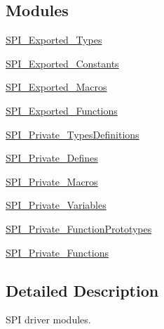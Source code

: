 \subsection*{Modules}
\begin{DoxyCompactItemize}
\item 
\hyperlink{group___s_p_i___exported___types}{S\+P\+I\+\_\+\+Exported\+\_\+\+Types}
\item 
\hyperlink{group___s_p_i___exported___constants}{S\+P\+I\+\_\+\+Exported\+\_\+\+Constants}
\item 
\hyperlink{group___s_p_i___exported___macros}{S\+P\+I\+\_\+\+Exported\+\_\+\+Macros}
\item 
\hyperlink{group___s_p_i___exported___functions}{S\+P\+I\+\_\+\+Exported\+\_\+\+Functions}
\item 
\hyperlink{group___s_p_i___private___types_definitions}{S\+P\+I\+\_\+\+Private\+\_\+\+Types\+Definitions}
\item 
\hyperlink{group___s_p_i___private___defines}{S\+P\+I\+\_\+\+Private\+\_\+\+Defines}
\item 
\hyperlink{group___s_p_i___private___macros}{S\+P\+I\+\_\+\+Private\+\_\+\+Macros}
\item 
\hyperlink{group___s_p_i___private___variables}{S\+P\+I\+\_\+\+Private\+\_\+\+Variables}
\item 
\hyperlink{group___s_p_i___private___function_prototypes}{S\+P\+I\+\_\+\+Private\+\_\+\+Function\+Prototypes}
\item 
\hyperlink{group___s_p_i___private___functions}{S\+P\+I\+\_\+\+Private\+\_\+\+Functions}
\end{DoxyCompactItemize}


\subsection{Detailed Description}
S\+PI driver modules. 

